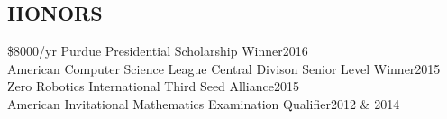 \documentclass[line,margin]{res}
\begin{document}
\begin{resume}



  \section{HONORS}
  \$8000/yr Purdue Presidential Scholarship Winner\hfill 2016\\
  American Computer Science League Central Divison Senior Level Winner\hfill 2015\\
  Zero Robotics International Third Seed Alliance\hfill 2015\\
  American Invitational Mathematics Examination Qualifier\hfill 2012 \& 2014

\end{resume}
\end{document}
